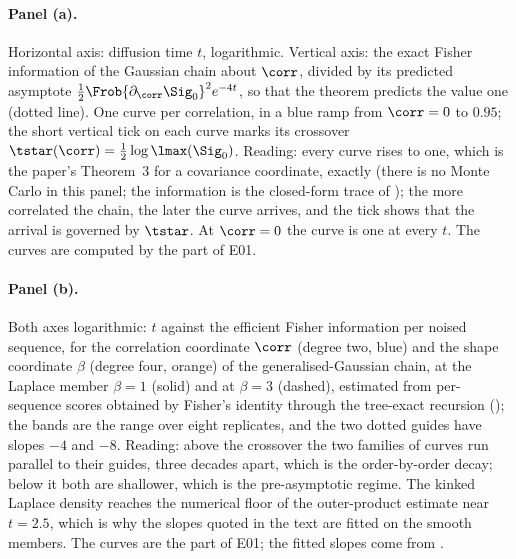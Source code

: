 \paragraph{Panel (a).} Horizontal axis: diffusion time $t$, logarithmic. Vertical
axis: the exact Fisher information of the Gaussian chain about $\corr$, divided by its
predicted asymptote $\tfrac12\Frob{\partial_\corr\Sig_0}^2e^{-4t}$, so that the theorem
predicts the value one (dotted line). One curve per correlation, in a blue ramp from
$\corr=0$ to $0.95$; the short vertical tick on each curve marks its crossover
$\tstar(\corr)=\tfrac12\log\lmax(\Sig_0)$. Reading: every curve rises to one, which is
the paper's Theorem~3 for a covariance coordinate, exactly (there is no Monte Carlo in
this panel; the information is the closed-form trace of
); the more correlated the chain, the later the curve
arrives, and the tick shows that the arrival is governed by $\tstar$. At $\corr=0$ the
curve is one at every $t$. The curves are computed by the  part of E01.

\paragraph{Panel (b).} Both axes logarithmic: $t$ against the efficient Fisher information
per noised sequence, for the correlation coordinate $\corr$ (degree two, blue) and the
shape coordinate $\beta$ (degree four, orange) of the generalised-Gaussian chain, at the
Laplace member $\beta=1$ (solid) and at $\beta=3$ (dashed), estimated from
per-sequence scores obtained by Fisher's identity through the tree-exact recursion
(); the bands are the range over eight replicates, and the
two dotted guides have slopes $-4$ and $-8$. Reading: above the crossover the two
families of curves run parallel to their guides, three decades apart, which is the
order-by-order decay; below it both are shallower, which is the pre-asymptotic regime.
The kinked Laplace density reaches the numerical floor of the outer-product estimate near
$t=2.5$, which is why the slopes quoted in the text are fitted on the smooth members.
The curves are the  part of E01; the fitted slopes come from
.

